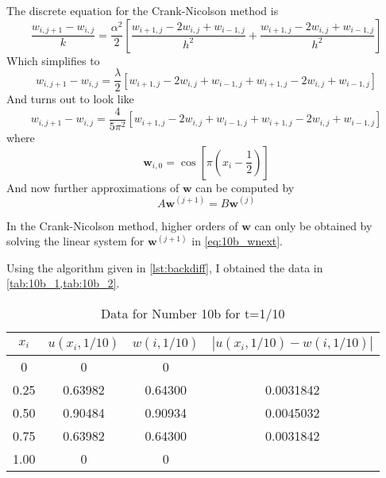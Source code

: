 \documentclass[12pt]{article}
\begin{document}
The discrete equation for the Crank-Nicolson method is
\begin{equation}
  \label{eq:10b_discrete}
  \frac{w_{i,j+1}-w_{i,j}}{k}=\frac{\alpha^2}{2}
  \left[\frac{w_{i+1,j}-2w_{i,j}+w_{i-1,j}}{h^2}
    + \frac{w_{i+1,j}-2w_{i,j}+w_{i-1,j}}{h^2}\right]
\end{equation}
Which simplifies to
\begin{equation}
  \label{eq:10b_discrete_simp}
  w_{i,j+1}-w_{i,j}=\frac{\lambda}{2}
  [w_{i+1,j}-2w_{i,j}+w_{i-1,j} + w_{i+1,j}-2w_{i,j}+w_{i-1,j}]
\end{equation}
And turns out to look like
\begin{equation}
  \label{eq:10b_discrete_simp}
  w_{i,j+1}-w_{i,j}=\frac{4}{5\pi^2}
  [w_{i+1,j}-2w_{i,j}+w_{i-1,j} + w_{i+1,j}-2w_{i,j}+w_{i-1,j}]
\end{equation}
where 
\begin{equation}
  \label{eq:10b_w_i_0}
  \mathbf{w}_{i,0} = \cos\left[\pi\left(x_i-\frac{1}{2}\right)\right]
\end{equation}
And now further approximations of $\mathbf{w}$ can be computed by
\begin{equation}
  \label{eq:10b_wnext}
  A\mathbf{w}^{(j+1)} = B\mathbf{w}^{(j)}
\end{equation}

In the Crank-Nicolson method, higher orders of $\mathbf{w}$ can
only be obtained by solving the linear system for
$\mathbf{w}^{(j+1)}$ in \cref{eq:10b_wnext}.


Using the algorithm given in \cref{lst:backdiff}, I obtained the data
in \cref{tab:10b_1,tab:10b_2}.

\begin{table}[H]
  \centering
  \begin{tabular}[p]{cccc}
    \hline
    $x_i$ & $u(x_i,1/10)$ & $w(i,1/10)$ & $|u(x_i,1/10)-w(i,1/10)|$ \\
    \hline
    0 & 0 & 0 & \\
    0.25 & 0.63982 & 0.64300 & 0.0031842 \\
    0.50 & 0.90484 & 0.90934 & 0.0045032 \\
    0.75 & 0.63982 & 0.64300 & 0.0031842 \\
    1.00 & 0 & 0 & \\
    \hline
  \end{tabular}
  \caption{Data for Number 10b for t=1/10}
  \label{tab:10b_1}
\end{table}
\end{document}

